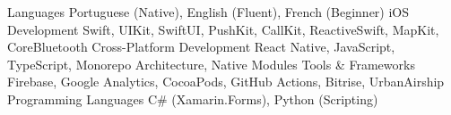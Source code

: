 \begin{cvskills}
  \cvskill
    {Languages}
    {Portuguese (Native), English (Fluent), French (Beginner)}  
  \cvskill
    {iOS Development}
    {Swift, UIKit, SwiftUI, PushKit, CallKit, ReactiveSwift, MapKit, CoreBluetooth}
  \cvskill
    {Cross-Platform Development}
    {React Native, JavaScript, TypeScript, Monorepo Architecture, Native Modules}
  \cvskill
    {Tools \& Frameworks}
    {Firebase, Google Analytics, CocoaPods, GitHub Actions, Bitrise, UrbanAirship}
  \cvskill
    {Programming Languages}
    {C\# (Xamarin.Forms), Python (Scripting)}
\end{cvskills}
